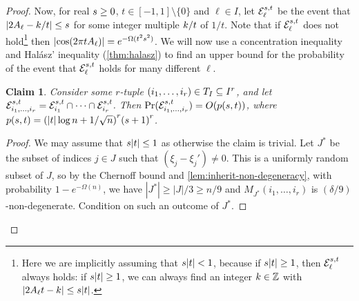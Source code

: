 \documentclass{daj}
\theoremstyle{plain}
\theoremstyle{plain}
\theoremstyle{plain}
\theoremstyle{plain}
\theoremstyle{definition}
\theoremstyle{plain}
\theoremstyle{plain}
\theoremstyle{definition}
\theoremstyle{definition}
\theoremstyle{plain}
\newtheorem{claim}[thm]{Claim}
\let\originalleft\left
\let\originalright\right
\renewcommand{\left}{\mathopen{}\mathclose\bgroup\originalleft}
\renewcommand{\right}{\aftergroup\egroup\originalright}
\begin{document}
\begin{proof}
Now, for real $s \ge0$, $t\in [-1,1]\setminus \{0\}$ and $\ell\in I$, let $\mathcal{E}_{\ell}^{s ,t}$ be the event that $|2A_{\ell}-k/t|\le s $
for some integer multiple $k/t$ of $1/t$. Note that if $\mathcal{E}_{\ell}^{s ,t}$
does not hold\footnote{Here we are implicitly assuming that $s |t|< 1$, because if $s |t|\ge 1$, then $\mathcal{E}_{\ell}^{s ,t}$ always holds: if $s |t|\ge 1$, we can always find an integer $k\in \mathbb{Z}$ with $|2A_{\ell}t-k|\le s |t|$.} then $\left|\cos\left(2\pi tA_{\ell}\right)\right|=e^{-\Omega(t^{2}\posreal^{2})}$. We will now use a concentration inequality and Hal\'asz' inequality (\cref{thm:halasz}) to find an upper bound for the probability of the event that $\mathcal{E}_{\ell}^{s ,t}$ holds for many different $\ell$.

\begin{claim}
\label{claim:Ekt-many-i}
Consider some $r$-tuple $(i_{1},\dots,i_{r})\in T_{I}\subseteq I^r$,
and let $\mathcal{E}_{i_{1},\dots,i_{r}}^{s ,t}=\mathcal{E}_{i_{1}}^{s ,t}\cap\dots\cap\mathcal{E}_{i_{r}}^{s ,t}$. Then $\Pr(\mathcal{E}_{i_{1},\dots,i_{r}}^{\posreal ,t})=O\left(p\left(\posreal ,t\right)\right)$,
where
$
p\left(\posreal ,t\right)=\left(\left|t\right|\log n+1/\sqrt n\right)^r\left(\posreal +1\right)^{r}
$.
\end{claim}
\begin{proof}
We may assume that $s |t|\le 1$ as otherwise the claim is trivial.
Let $J^*$ be the subset of indices $j\in J$ such that $(\xi_{j}-\xi_{j}')\ne 0$. This is a uniformly random subset of $J$, so by the Chernoff bound and \cref{lem:inherit-non-degeneracy}, with probability $1-e^{-\Omega(n)}$, we have $|J^*|\ge |J|/3\ge n/9$ and $M_{J^*}(i_1,\dots,i_r)$ is $(\delta/9)$-non-degenerate. Condition on such an outcome of $J^*$.


\end{proof}
\end{proof}
\end{document}
